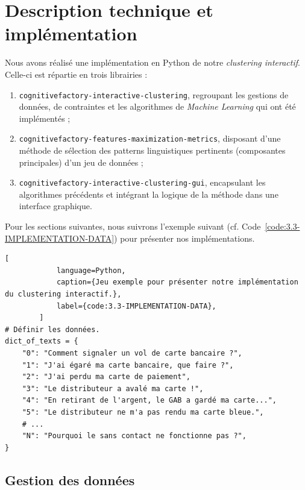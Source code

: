 		
    \section{Description technique et implémentation}
	\label{section:3.3-DESCRIPTION-IMPLEMENTATION}
		
		Nous avons réalisé une implémentation en Python de notre \textit{clustering interactif}. Celle-ci est répartie en trois librairies :
		\begin{enumerate}
			\item \texttt{cognitivefactory-interactive-clustering}, regroupant les gestions de données, de contraintes et les algorithmes de \textit{Machine Learning} qui ont été implémentés ;
			\item \texttt{cognitivefactory-features-maximization-metrics}, disposant d'une méthode de sélection des patterns linguistiques pertinents (composantes principales) d'un jeu de données ;
			\item \texttt{cognitivefactory-interactive-clustering-gui}, encapsulant les algorithmes précédents et intégrant la logique de la méthode dans une interface graphique.
		\end{enumerate}
		
		Pour les sections suivantes, nous suivrons l'exemple suivant (cf. Code~\ref{code:3.3-IMPLEMENTATION-DATA}) pour présenter nos implémentations.
		
		\begin{lstlisting}[
			language=Python,
			caption={Jeu exemple pour présenter notre implémentation du clustering interactif.},
			label={code:3.3-IMPLEMENTATION-DATA},
		]
# Définir les données.
dict_of_texts = {
    "0": "Comment signaler un vol de carte bancaire ?",
    "1": "J'ai égaré ma carte bancaire, que faire ?",
    "2": "J'ai perdu ma carte de paiement",
    "3": "Le distributeur a avalé ma carte !",
    "4": "En retirant de l'argent, le GAB a gardé ma carte...",
    "5": "Le distributeur ne m'a pas rendu ma carte bleue.",
    # ...
    "N": "Pourquoi le sans contact ne fonctionne pas ?",
}
		\end{lstlisting}
		
		
		\subsection{Gestion des données}
		\label{section:3.3.1-GESTION-DES-DONNEES}
				
